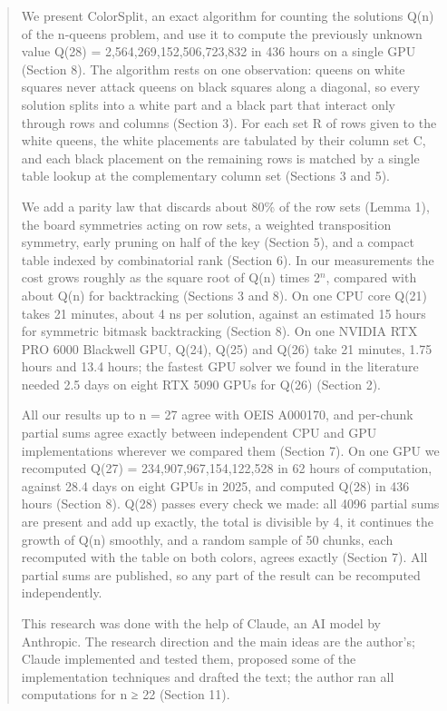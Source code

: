 

\begin{abstract}

We present ColorSplit, an exact algorithm for counting the solutions Q(n) of the n-queens problem, and use it to compute the previously unknown value Q(28) = 2,564,269,152,506,723,832 in 436 hours on a single GPU (Section 8). The algorithm rests on one observation: queens on white squares never attack queens on black squares along a diagonal, so every solution splits into a white part and a black part that interact only through rows and columns (Section 3). For each set R of rows given to the white queens, the white placements are tabulated by their column set C, and each black placement on the remaining rows is matched by a single table lookup at the complementary column set (Sections 3 and 5).

We add a parity law that discards about 80\% of the row sets (Lemma 1), the board symmetries acting on row sets, a weighted transposition symmetry, early pruning on half of the key (Section 5), and a compact table indexed by combinatorial rank (Section 6). In our measurements the cost grows roughly as the square root of Q(n) times 2$^{n}$, compared with about Q(n) for backtracking (Sections 3 and 8). On one CPU core Q(21) takes 21 minutes, about 4 ns per solution, against an estimated 15 hours for symmetric bitmask backtracking (Section 8). On one NVIDIA RTX PRO 6000 Blackwell GPU, Q(24), Q(25) and Q(26) take 21 minutes, 1.75 hours and 13.4 hours; the fastest GPU solver we found in the literature needed 2.5 days on eight RTX 5090 GPUs for Q(26) (Section 2).

All our results up to n = 27 agree with OEIS A000170, and per-chunk partial sums agree exactly between independent CPU and GPU implementations wherever we compared them (Section 7). On one GPU we recomputed Q(27) = 234,907,967,154,122,528 in 62 hours of computation, against 28.4 days on eight GPUs in 2025, and computed Q(28) in 436 hours (Section 8). Q(28) passes every check we made: all 4096 partial sums are present and add up exactly, the total is divisible by 4, it continues the growth of Q(n) smoothly, and a random sample of 50 chunks, each recomputed with the table on both colors, agrees exactly (Section 7). All partial sums are published, so any part of the result can be recomputed independently.

This research was done with the help of Claude, an AI model by Anthropic. The research direction and the main ideas are the author's; Claude implemented and tested them, proposed some of the implementation techniques and drafted the text; the author ran all computations for n ≥ 22 (Section 11).

\end{abstract}
